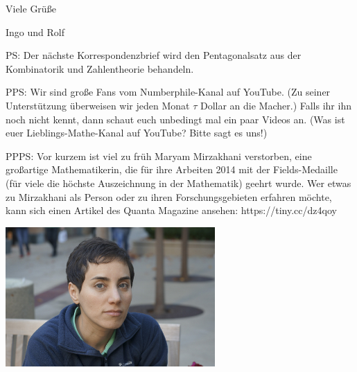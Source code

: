 \documentclass{anschreiben}
\begin{document}
\enlargethispage{2em}
Viele Grüße

Ingo und Rolf

PS: Der nächste Korrespondenzbrief wird den Pentagonalsatz aus der Kombinatorik
und Zahlentheorie behandeln.

PPS: Wir sind große Fans vom Numberphile-Kanal auf YouTube. (Zu seiner
Unterstützung überweisen wir jeden Monat $\tau$ Dollar an die Macher.) Falls
ihr ihn noch nicht kennt, dann schaut euch unbedingt mal ein paar Videos an.
(Was ist euer Lieblings-Mathe-Kanal auf YouTube? Bitte sagt es uns!)

PPPS: Vor kurzem ist viel zu früh Maryam Mirzakhani verstorben, eine großartige
Mathematikerin, die für ihre Arbeiten 2014 mit der Fields-Medaille (für viele
die höchste Auszeichnung in der Mathematik) geehrt wurde. Wer etwas zu
Mirzakhani als Person oder zu ihren Forschungsgebieten erfahren möchte, kann
sich einen Artikel des Quanta Magazine ansehen: https://tiny.cc/dz4qoy

\begin{center}
  \includegraphics[width=0.6\textwidth]{mirzakhani}
\end{center}

\newpage
\fi\ifmore\repeat

\closein\quelle
\end{document}
